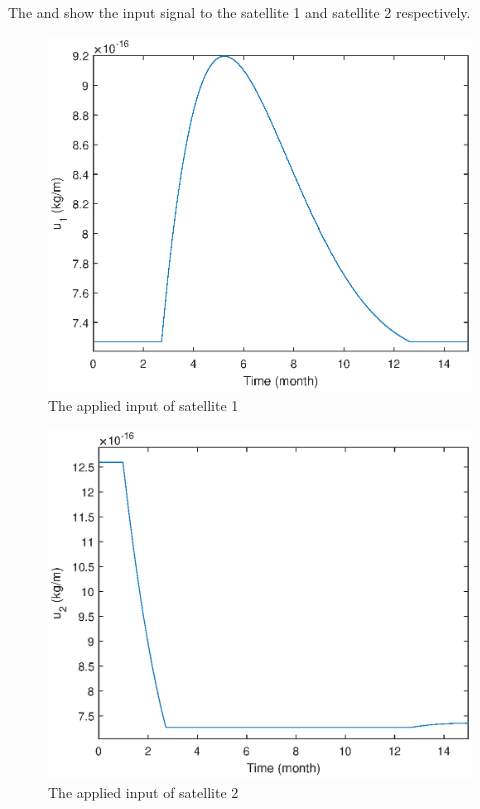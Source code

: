 The  and  show the input signal to the satellite 1 and satellite 2 respectively.
\begin{table}[H]
	\begin{minipage}[b]{0.49\linewidth}
		\centering
		\begin{figure}[H]
			\centering
			\includegraphics[width=1\linewidth]{figures/u_1.eps}
			\caption{ The applied input of satellite 1 }
			\label{fig:distancecontrol3}
		\end{figure}
	\end{minipage}\hfill
	\begin{minipage}[b]{0.49\linewidth}
		\centering
		\begin{figure}[H]
			\centering
			\includegraphics[width=1\linewidth]{figures/u_2.eps}
			\caption{The applied input of satellite 2}
			\label{fig:distancecontrol4}
		\end{figure}
	\end{minipage}
\end{table}
